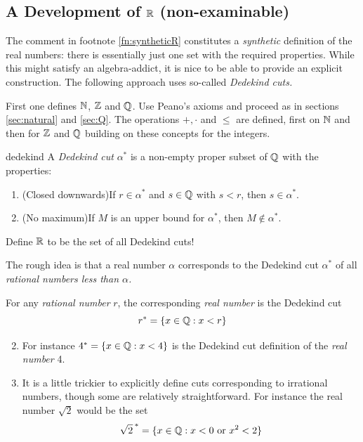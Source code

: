 \clearpage


\subsection[A Development of R]{A Development of $\mathbb{R}$ (non-examinable)}\label{sec:dedekind}

The comment in footnote \ref{fn:syntheticR} constitutes a \emph{synthetic} definition of the real numbers: there is essentially just one set with the required properties. While this might satisfy an algebra-addict, it is nice to be able to provide an explicit construction. The following approach uses so-called \emph{Dedekind cuts.}\medbreak

First one defines $\mathbb{N}$, $\mathbb{Z}$ and $\mathbb{Q}$. Use Peano's axioms and proceed as in sections \ref{sec:natural} and \ref{sec:Q}. The operations $+,\cdot$ and $\le$ are defined, first on $\mathbb{N}$ and then for $\mathbb{Z}$ and $\mathbb{Q}$ building on these concepts for the integers.

\begin{defn}{}{dedekind}
	A \emph{Dedekind cut} $\alpha^*$ is a non-empty proper subset of $\mathbb{Q}$ with the properties:
	\begin{enumerate}
  	\item (Closed downwards)\lstsp If $r\in\alpha^*$ and $s\in\mathbb{Q}$ with $s<r$, then $s\in\alpha^*$.
  	\item (No maximum)\lstsp If $M$ is an upper bound for $\alpha^*$, then $M\not\in\alpha^*$.
	\end{enumerate}
	Define $\mathbb{R}$ to be the set of all Dedekind cuts!
\end{defn}

The rough idea is that a real number $\alpha$ corresponds to the Dedekind cut $\alpha^*$ of all \emph{rational numbers less than $\alpha$.}

\begin{examples}{}{}
	\exstart For any \emph{rational number} $r$, the corresponding \emph{real number} is the Dedekind cut
	\[
		r^*=\{x\in\mathbb{Q}:x<r\}
	\]
	\begin{enumerate}\setcounter{enumi}{1}
	  \item[]For instance $4^*=\{x\in\mathbb{Q}:x<4\}$ is the Dedekind cut definition of the  \emph{real number} 4.
	  \item It is a little trickier to explicitly define cuts corresponding to irrational numbers, though some are relatively straightforward. For instance the real number $\sqrt 2$ would be the set
		\[
			{\sqrt 2\,}^*=\{x\in\mathbb{Q}:x<0\text{ or }x^2<2\}
		\]
	\end{enumerate}
\end{examples}

